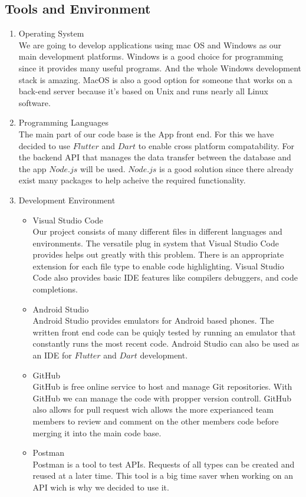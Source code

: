 \documentclass[10pt]{article}
\begin{document}
\begin{multicols*}{2}
\section{Tools and Environment}

\begin{enumerate}
  \item {Operating System} \\
  We are going to develop applications using mac OS and Windows as our main development platforms. Windows is a good choice for programming since it provides many useful programs. And the whole Windows development stack is amazing. MacOS is also a good option for someone that works on a back-end server because it's based on Unix and runs nearly all Linux software.
  
  \item {Programming Languages} \\
  The main part of our code base is the App front end. For this we have decided to use $Flutter$ and $Dart$ to enable cross platform compatability. For the backend API that manages the data transfer between the database and the app $Node.js$ will be used. $Node.js$ is a good solution since there already exist many packages to help acheive the required functionality.
  
  \item {Development Environment}
  \begin{itemize}
    \item {Visual Studio Code} \\
    Our project consists of many different files in different languages and environments. The versatile plug in system that Visual Studio Code provides helps out greatly with this problem. There is an appropriate extension for each file type to enable code highlighting. Visual Studio Code also provides basic IDE features like compilers debuggers, and code completions.
    \item {Android Studio} \\
    Android Studio provides emulators for Android based phones. The written front end code can be quiqly tested by running an emulator that constantly runs the most recent code. Android Studio can also be used as an IDE for $Flutter$ and $Dart$ development.
    \item {GitHub} \\
    GitHub is free online service to host and manage Git repositories. With GitHub we can manage the code with propper version controll. GitHub also allows for pull request wich allows the more experianced team members to review and comment on the other members code before merging it into the main code base.
    \item {Postman} \\
    Postman is a tool to test APIs. Requests of all types can be created and reused at a later time. This tool is a big time saver when working on an API wich is why we decided to use it.
  \end{itemize}


\end{enumerate}
\end{multicols*}
\end{document}
